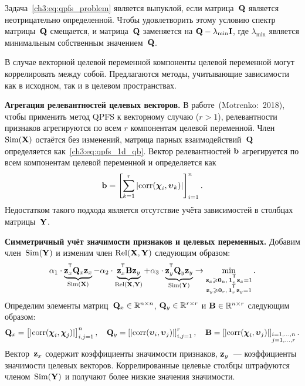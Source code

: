 \documentclass[11pt, a5paper]{dissert}
\begin{document}
Задача~\eqref{ch3:eq:qpfs_problem} является выпуклой, если матрица~$\mathbf{Q}$ является неотрицательно определенной. 
Чтобы удовлетворить этому условию спектр матрицы~$\mathbf{Q}$ смещается, и матрица~$\mathbf{Q}$ заменяется на $\mathbf{Q} - \lambda_{\text{min}} \mathbf{I}$, где $\lambda_{\text{min}} $ является минимальным собственным значением~$\mathbf{Q}$.

В случае векторной целевой переменной компоненты целевой переменной могут коррелировать между собой. 
Предлагаются методы, учитывающие зависимости как в исходном, так и в целевом пространствах.

\textbf{Агрегация релевантностей целевых векторов.}
В работе~(Motrenko:~2018), чтобы применить метод QPFS к векторному случаю ($r > 1$), релевантности признаков агрегируются по всем $r$ компонентам целевой переменной. 
Член $\text{Sim}(\mathbf{X})$ остаётся без изменений, матрица парных взаимодействий~$\mathbf{Q}$ определяется как~\eqref{ch3:eq:qpfs_1d_qb}. 
Вектор релевантностей $\mathbf{b}$ агрегируется по всем компонентам целевой переменной и определяется как
\begin{equation*}
	\mathbf{b} = \left[\sum_{k=1}^r|\text{corr}(\boldsymbol{\chi}_i, \boldsymbol{\upsilon}_k)|\right]_{i=1}^n.
\end{equation*}
Недостатком такого подхода является отсутствие учёта зависимостей в столбцах матрицы~$\mathbf{Y}$. 

\textbf{Симметричный учёт значимости признаков и целевых переменных.}
Добавим член~$\text{Sim}(\mathbf{Y})$ и изменим член $\text{Rel}(\mathbf{X}, \mathbf{Y})$ следующим образом:
\begin{equation}
	\alpha_1 \cdot \underbrace{\bz_x^{\T} \bQ_x \bz_x}_{\text{Sim}(\bX)} - \alpha_2 \cdot \underbrace{\bz_x^{\T} \bB \bz_y}_{\text{Rel}(\bX, \bY)} + \alpha_3 \cdot \underbrace{\bz_y^{\T} \bQ_y \bz_y}_{\text{Sim}(\bY)} \rightarrow \min_{\substack{\bz_x \geq \bZero_n, \, \bOne_n^{\T}\bz_x=1 \\ \bz_y \geq \bZero_r, \, \bOne_r^{\T}\bz_y=1}}.
	\label{ch3:eq:symimp}
\end{equation}
Определим элементы матриц~$\mathbf{Q}_x \in \mathbb{R}^{n \times n}$, $\mathbf{Q}_y \in \mathbb{R}^{r \times r}$ и $\mathbf{B} \in \mathbb{R}^{n \times r}$ следующим образом:
\begin{equation*}
	\mathbf{Q}_x = \left[ |\text{corr}(\boldsymbol{\chi}_i, \boldsymbol{\chi}_j)| \right]_{i,j=1}^n, \quad
	\mathbf{Q}_y = \left[ |\text{corr}(\boldsymbol{\upsilon}_i, \boldsymbol{\upsilon}_j)| \right]_{i,j=1}^r, \quad
	\mathbf{B} =  \left[ |\text{corr}(\boldsymbol{\chi}_i, \boldsymbol{\upsilon}_j)| \right]_{\substack{i=1, \dots, n \\ j=1, \dots, r}}.
\end{equation*}
Вектор~$\mathbf{z}_x$ содержит коэффициенты значимости признаков, $\mathbf{z}_y$~--- коэффициенты значимости целевых векторов.
Коррелированные целевые столбцы штрафуются членом~$\text{Sim}(\mathbf{Y})$ и получают более низкие значения значимости.
\end{document}
